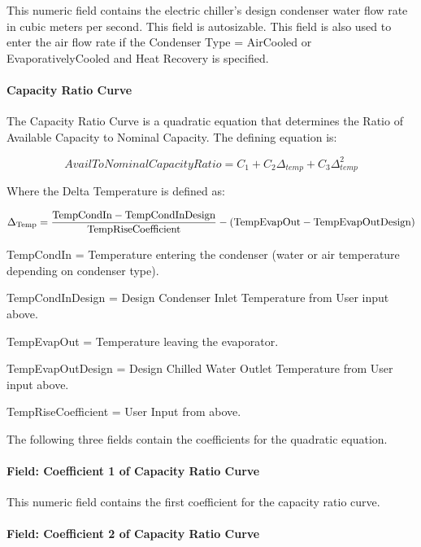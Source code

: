This numeric field contains the electric chiller's design condenser water flow rate in cubic meters per second. This field is autosizable. This field is also used to enter the air flow rate if the Condenser Type = AirCooled or EvaporativelyCooled and Heat Recovery is specified.

\paragraph{Capacity Ratio Curve}\label{capacity-ratio-curve}

The Capacity Ratio Curve is a quadratic equation that determines the Ratio of Available Capacity to Nominal Capacity. The defining equation is:

\begin{equation}
AvailToNominalCapacityRatio = {C_1} + {C_2}{\Delta_{temp}} + {C_3}\Delta_{temp}^2
\end{equation}

Where the Delta Temperature is defined as:

\begin{equation}
{\Delta_{{\rm{Temp}}}} = \frac{{{\rm{TempCondIn  -  TempCondInDesign }}}}{{{\rm{TempRiseCoefficient}}}} - ({\rm{TempEvapOut  -  TempEvapOutDesign)}}
\end{equation}

TempCondIn = Temperature entering the condenser (water or air temperature depending on condenser type).

TempCondInDesign = Design Condenser Inlet Temperature from User input above.

TempEvapOut = Temperature leaving the evaporator.

TempEvapOutDesign = Design Chilled Water Outlet Temperature from User input above.

TempRiseCoefficient = User Input from above.

The following three fields contain the coefficients for the quadratic equation.

\paragraph{Field: Coefficient 1 of Capacity Ratio Curve}\label{field-coefficient-1-of-capacity-ratio-curve}

This numeric field contains the first coefficient for the capacity ratio curve.

\paragraph{Field: Coefficient 2 of Capacity Ratio Curve}\label{field-coefficient-2-of-capacity-ratio-curve}

